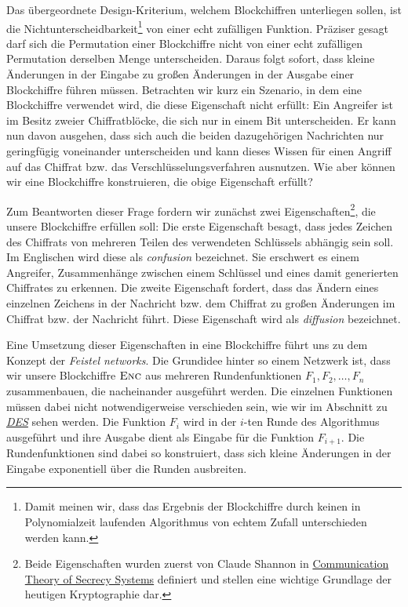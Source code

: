 Das übergeordnete Design-Kriterium, welchem Blockchiffren unterliegen sollen, ist die Nichtunterscheidbarkeit\footnote{Damit meinen wir, dass das Ergebnis der Blockchiffre durch keinen in Polynomialzeit laufenden Algorithmus von echtem Zufall unterschieden werden kann.} von einer echt zufälligen Funktion. Präziser gesagt darf sich die Permutation einer Blockchiffre nicht von einer echt zufälligen Permutation derselben Menge unterscheiden. Daraus folgt sofort, dass kleine Änderungen in der Eingabe zu großen Änderungen in der Ausgabe einer Blockchiffre führen müssen. Betrachten wir kurz ein Szenario, in dem eine Blockchiffre verwendet wird, die diese Eigenschaft nicht erfüllt: Ein Angreifer ist im Besitz zweier Chiffratblöcke, die sich nur in einem Bit unterscheiden. Er kann nun davon ausgehen, dass sich auch die beiden dazugehörigen Nachrichten nur geringfügig voneinander unterscheiden und kann dieses Wissen für einen Angriff auf das Chiffrat bzw. das Verschlüsselungsverfahren ausnutzen. Wie aber können wir eine Blockchiffre konstruieren, die obige Eigenschaft erfüllt?

Zum Beantworten dieser Frage fordern wir zunächst zwei Eigenschaften\footnote{Beide Eigenschaften wurden zuerst von Claude Shannon in \href{http://netlab.cs.ucla.edu/wiki/files/shannon1949.pdf}{Communication Theory of Secrecy Systems} definiert und stellen eine wichtige Grundlage der heutigen Kryptographie dar.}, die unsere Blockchiffre erfüllen soll:
Die erste Eigenschaft besagt, dass jedes Zeichen des Chiffrats von mehreren Teilen des verwendeten Schlüssels abhängig sein soll. Im Englischen wird diese als \textit{confusion} bezeichnet. Sie erschwert es einem Angreifer, Zusammenhänge zwischen einem Schlüssel und eines damit generierten Chiffrates zu erkennen.
Die zweite Eigenschaft fordert, dass das Ändern eines einzelnen Zeichens in der Nachricht bzw. dem Chiffrat zu großen Änderungen im Chiffrat bzw. der Nachricht führt. Diese Eigenschaft wird als \textit{diffusion} bezeichnet.

Eine Umsetzung dieser Eigenschaften in eine Blockchiffre führt uns zu dem Konzept der \textit{Feistel networks}.
Die Grundidee hinter so einem Netzwerk ist, dass wir unsere Blockchiffre \(\textsc{Enc}\) aus mehreren Rundenfunktionen \(F_1, F_2,\dots, F_n\) zusammenbauen, die nacheinander ausgeführt werden. Die einzelnen Funktionen müssen dabei nicht notwendigerweise verschieden sein, wie wir im Abschnitt zu \hyperref[sssec:des]{\textit{DES}} sehen werden. Die Funktion \(F_i\) wird in der $i$-ten Runde des Algorithmus ausgeführt und ihre Ausgabe dient als Eingabe für die Funktion \(F_{i+1}\). Die Rundenfunktionen sind dabei so konstruiert, dass sich kleine Änderungen in der Eingabe exponentiell über die Runden ausbreiten.

